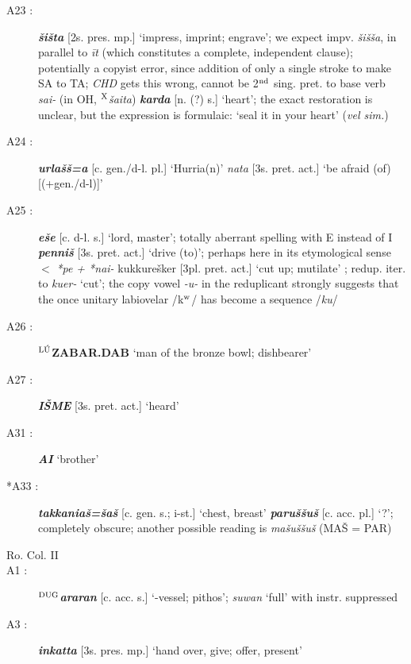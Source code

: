 \documentclass[10pt]{article}
\newcommand{\supersc}[1]{$^{\textrm{\scriptsize{#1}}}$}  	%
\newcommand{\bit}[1]{\textbf{\textit{#1}}}				%
\newcommand{\p}[1]{{\tiny[{#1}]}}					%
\newcommand{\labk}{k{\supersc{w}}}							%
\newcommand{\hith}{\textsubwedge{h}}
\newcommand{\Hith}{\textsubwedge{H}}
\newcommand{\man}{\supersc{L\'U}}
\newcommand{\clay}{\supersc{DUG}}
\renewcommand{\.}[1]{\textsubdot{#1}}
\begin{document}
\begin{description}
\item[A23 :] \bit{\v{s}i\v{s}ta} \p{2s. pres. mp.} `impress, imprint; engrave'; we expect impv. \textit{\v{s}i\v{s}\v{s}a}, in parallel to \textit{\=it} (which constitutes a complete, independent clause); potentially a copyist error, since addition of only a single stroke to make SA to TA; \textit{CHD} gets this wrong, cannot be 2\supersc{nd} sing. pret. to base verb \textit{sai-} (in OH, \supersc{X}\textit{\v{s}aita}) \bit{karda} \p{n. (?) s.} `heart'; the exact restoration is unclear, but the expression is formulaic: `seal it in your heart' (\textit{vel sim.})

\item[A24 :] \bit{{\hith}urla\v{s}\v{s}=a} \p{c. gen./d-l. pl.} `Hurria(n)' \textit{na{\hith\hith}ta} \p{3s. pret. act.} `be afraid (of) \p{(+gen./d-l)}'

\item[A25 :] \bit{e\v{s}{\hith}e} \p{c. d-l. s.} `lord, master'; totally aberrant spelling with {\Hith}E instead of {\Hith}I \bit{penni\v{s}} \p{3s. pret. act.} `drive (to)'; perhaps here in its etymological sense $<$ \textit{*pe + *nai-} {kukkure\v{s}ker} \p{3pl. pret. act.} `cut up; mutilate' ; redup. iter. to \textit{kuer-} `cut'; the copy vowel \textit{-u-} in the reduplicant strongly suggests that the once unitary labiovelar /{\labk}/ has become a sequence /\textit{ku}/

\item[A26 :] \textbf{{\man}ZABAR.DAB} `man of the bronze bowl; dishbearer'

\item[A27 :] \bit{I\v{S}ME} \p{3s. pret. act.} `heard'

\item[A31 :] \bit{A{\Hith}I} `brother'

\item[*A33 :] \bit{takkania\v{s}=\v{s}a\v{s}} \p{c. gen. s.; i-st.} `chest, breast' \bit{par{\hith}u\v{s}\v{s}u\v{s}} \p{c. acc. pl.} `?'; completely obscure; another possible reading is \textit{ma\v{s}{\hith}u\v{s}\v{s}u\v{s}} (MA\v{S} = PAR)

\smallskip
\item[Ro. Col. II]
\smallskip

\item[A1 :] \textbf{\clay}\bit{{\hith}ar{\hith}aran} \p{c. acc. s.} `{\hith}-vessel; pithos'; \textit{suwan} `full' with instr. suppressed

\item[A3 :] \bit{{\hith}inkatta} \p{3s. pres. mp.} `hand over, give; offer, present'


\end{description}
\end{document}
